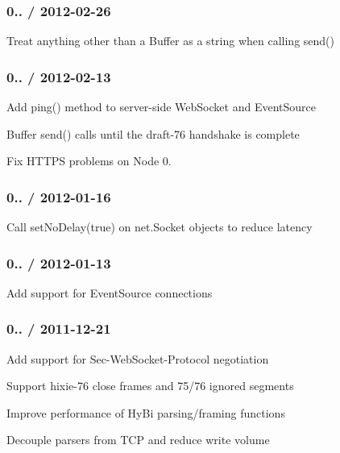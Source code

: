 \subsubsection*{0.. / 2012-\/02-\/26}


\begin{DoxyItemize}
\item Treat anything other than a {\ttfamily Buffer} as a string when calling {\ttfamily send()}
\end{DoxyItemize}

\subsubsection*{0.. / 2012-\/02-\/13}


\begin{DoxyItemize}
\item Add {\ttfamily ping()} method to server-\/side {\ttfamily Web\+Socket} and {\ttfamily Event\+Source}
\item Buffer {\ttfamily send()} calls until the draft-\/76 handshake is complete
\item Fix H\+T\+T\+PS problems on Node 0.
\end{DoxyItemize}

\subsubsection*{0.. / 2012-\/01-\/16}


\begin{DoxyItemize}
\item Call {\ttfamily set\+No\+Delay(true)} on {\ttfamily net.\+Socket} objects to reduce latency
\end{DoxyItemize}

\subsubsection*{0.. / 2012-\/01-\/13}


\begin{DoxyItemize}
\item Add support for {\ttfamily Event\+Source} connections
\end{DoxyItemize}

\subsubsection*{0.. / 2011-\/12-\/21}


\begin{DoxyItemize}
\item Add support for {\ttfamily Sec-\/\+Web\+Socket-\/\+Protocol} negotiation
\item Support {\ttfamily hixie-\/76} close frames and 75/76 ignored segments
\item Improve performance of Hy\+Bi parsing/framing functions
\item Decouple parsers from T\+CP and reduce write volume
\end{DoxyItemize}

